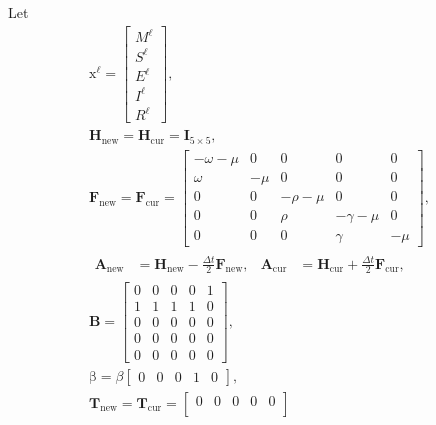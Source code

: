 \documentclass[USenglish]{article}
\renewcommand{\vec}[1]{\boldsymbol{\mathrm{#1}}}
\newcommand{\mat}[1]{\mathbf{#1}}
\begin{document}
Let
\begin{subequations}
  \begin{gather}
    \vec{x}^{\ell} =
    \begin{bmatrix}
      M^{\ell} \\ S^{\ell} \\ E^{\ell} \\ I^{\ell} \\ R^{\ell}
    \end{bmatrix},
    \\
    \mat{H}_{\mathrm{new}} =
    \mat{H}_{\mathrm{cur}} =
    \mat{I}_{5 \times 5},
    \\
    \mat{F}_{\mathrm{new}} =
    \mat{F}_{\mathrm{cur}} =
    \begin{bmatrix}
      - \omega - \mu & 0 & 0 & 0 & 0 \\
      \omega & - \mu & 0 & 0 & 0 \\
      0 & 0 & - \rho - \mu & 0 & 0 \\
      0 & 0 & \rho & - \gamma - \mu & 0 \\
      0 & 0 & 0 & \gamma & - \mu
    \end{bmatrix},
    \\
    \begin{aligned}
      \mat{A}_{\mathrm{new}} &=
      \mat{H}_{\mathrm{new}} - \frac{\Delta t}{2} \mat{F}_{\mathrm{new}},
      &
      \mat{A}_{\mathrm{cur}} &=
      \mat{H}_{\mathrm{cur}} + \frac{\Delta t}{2} \mat{F}_{\mathrm{cur}},
    \end{aligned}
    \\
    \mat{B} =
    \begin{bmatrix}
      0 & 0 & 0 & 0 & 1 \\
      1 & 1 & 1 & 1 & 0 \\
      0 & 0 & 0 & 0 & 0 \\
      0 & 0 & 0 & 0 & 0 \\
      0 & 0 & 0 & 0 & 0
    \end{bmatrix},
    \\
    \vec{\beta} =
    \beta
    \begin{bmatrix}
      0 & 0 & 0 & 1 & 0
    \end{bmatrix},
    \\
    \mat{T}_{\mathrm{new}} =
    \mat{T}_{\mathrm{cur}} =
    \begin{bmatrix}
      0 & 0 & 0 & 0 & 0 \\

\end{bmatrix}
\end{gather}
\end{subequations}
\end{document}
